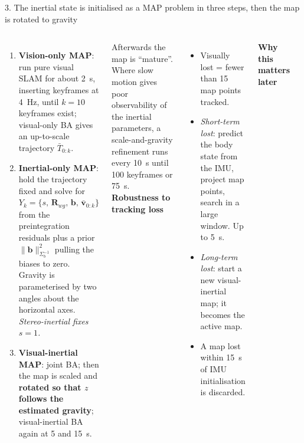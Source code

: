 \documentclass[11pt,aspectratio=169]{beamer}
\begin{document}
\begin{frame}{3. The inertial state is initialised as a MAP problem in three steps, then the map is rotated to gravity}
  \begin{columns}[T]
      \scriptsize
      \begin{enumerate}
        \item \textbf{Vision-only MAP}: run pure visual SLAM for about
              \SI{2}{\second}, inserting keyframes at \SI{4}{\hertz}, until
              $k=10$ keyframes exist; visual-only BA gives an up-to-scale
              trajectory $\bar T_{0:k}$.
        \item \textbf{Inertial-only MAP}: hold the trajectory fixed and solve
              for $Y_k=\{s,\,\mathbf R_{wg},\,\mathbf b,\,\bar{\mathbf v}_{0:k}\}$
              from the preintegration residuals plus a prior
              $\lVert\mathbf b\rVert^2_{\Sigma_b^{-1}}$ pulling the biases to
              zero. Gravity is parameterised by two angles about the
              horizontal axes. \emph{Stereo-inertial fixes $s=1$.}
        \item \textbf{Visual-inertial MAP}: joint BA; then the map is scaled
              and \textbf{rotated so that $z$ follows the estimated gravity};
              visual-inertial BA again at 5 and \SI{15}{\second}.
      \end{enumerate}
      Afterwards the map is ``mature''. Where slow motion gives poor
      observability of the inertial parameters, a scale-and-gravity
      refinement runs every \SI{10}{\second} until 100 keyframes or
      \SI{75}{\second}.
      \scriptsize
      \textbf{Robustness to tracking loss}
      \begin{itemize}
        \item Visually lost = fewer than 15 map points tracked.
        \item \emph{Short-term lost}: predict the body state from the IMU,
              project map points, search in a large window. Up to
              \SI{5}{\second}.
        \item \emph{Long-term lost}: start a new visual-inertial map; it
              becomes the active map.
        \item A map lost within \SI{15}{\second} of IMU initialisation is
              discarded.
      \end{itemize}
      \vspace{0.6em}
      \textbf{Why this matters later}
      \begin{itemize}

\end{itemize}
\end{columns}
\end{frame}
\end{document}
